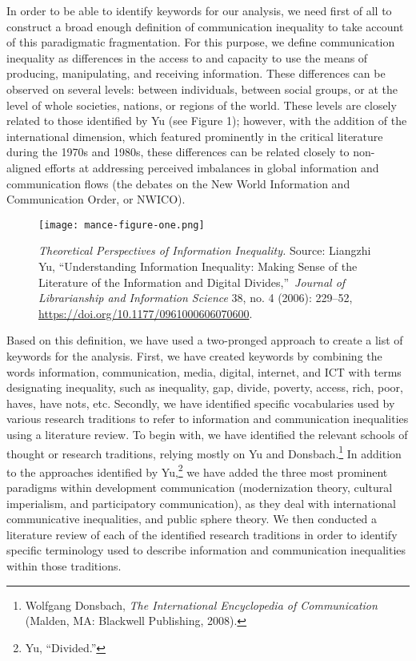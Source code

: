 \documentclass{tufte-handout}
\begin{document}
In order to be able to identify keywords for our analysis, we need first
of all to construct a broad enough definition of communication
inequality to take account of this paradigmatic fragmentation. For this
purpose, we define communication inequality as differences in the access
to and capacity to use the means of producing, manipulating, and
receiving information. These differences can be observed on several
levels: between individuals, between social groups, or at the level of
whole societies, nations, or regions of the world. These levels are
closely related to those identified by Yu (see Figure 1); however, with
the addition of the international dimension, which featured prominently
in the critical literature during the 1970s and 1980s, these differences
can be related closely to non-aligned efforts at addressing perceived
imbalances in global information and communication flows (the debates on
the New World Information and Communication Order, or NWICO).

\vspace*{2em}

\begin{figure}
    \centering
    \texttt{[image: mance-figure-one.png]}
    \caption{\emph{Theoretical Perspectives of Information Inequality.}
Source: Liangzhi Yu, ``Understanding Information Inequality: Making
Sense of the Literature of the Information and Digital
Divides,''~\emph{Journal of Librarianship and Information Science} 38,
no. 4 (2006): 229--52, \url{https://doi.org/10.1177/0961000606070600}.}
    \label{fig:one}
\end{figure}


Based on this definition, we have used a two-pronged approach to create
a list of keywords for the analysis. First, we have created keywords by
combining the words information, communication, media, digital,
internet, and ICT with terms designating inequality, such as inequality,
gap, divide, poverty, access, rich, poor, haves, have nots, etc.
Secondly, we have identified specific vocabularies used by various
research traditions to refer to information and communication
inequalities using a literature review. To begin with, we have
identified the relevant schools of thought or research traditions,
relying mostly on Yu and Donsbach.\footnote{Wolfgang Donsbach, \emph{The
  International Encyclopedia of Communication} (Malden, MA: Blackwell
  Publishing, 2008).} In addition to the approaches identified by
Yu,\footnote{Yu, ``Divided.''} we have added the three most prominent
paradigms within development communication (modernization theory,
cultural imperialism, and participatory communication), as they deal
with international communicative inequalities, and public sphere theory.
We then conducted a literature review of each of the identified research
traditions in order to identify specific terminology used to describe
information and communication inequalities within those traditions.
\end{document}
